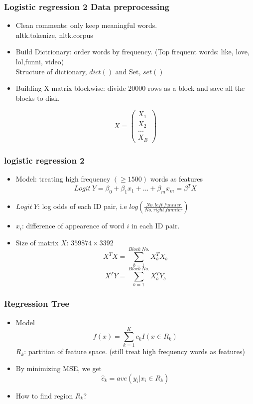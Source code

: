 \documentclass[fleqn]{beamer}
\begin{document}
\begin{frame}
\frametitle{Logistic regression 2 Data preprocessing}
    \begin{itemize}
     \item Clean comments: only keep meaningful words.\\
     nltk.tokenize, nltk.corpus 
     \item Build Dictrionary: order words by frequency. (Top frequent words: like, love, lol,funni, video) \\
     Structure of dictionary, $dict()$ and Set, $set()$
     \item Building X matrix blockwise: divide $20000$ rows as a block and save all the blocks to disk.      
	 \begin{center}
	 \[ X =\left( \begin{array}{ccc}
	    X_1 \\
	    X_2 \\
	    ... \\
	    X_B \end{array} \right)
	  \]
	\end{center}
     \end{itemize}

\end{frame}
\begin{frame}
\frametitle{logistic regression 2}
    \begin{itemize}
     \item Model: treating high frequency $(\geq 1500)$ words as features\\
     $$Logit\ Y = \beta_0 + \beta_1 x_1 + ... + \beta_m x_m = \beta^T X$$
     \item $Logit\ Y$: log odds of each ID pair, i.e $log(\frac{No.\ left\ funnier}{No.\ right\ funnier})$
     \item $x_i$:  difference of appearence of word $i$ in each ID pair.
     \item Size of matrix $X$: $359874 \times 3392$\\
     $$X^TX = \sum_{b=1}^{Block\ No.} X_b^TX_b$$
     $$X^TY = \sum_{b=1}^{Block\ No.} X_b^TY_b$$
    \end{itemize}
\end{frame}
\begin{frame}
\frametitle{Regression Tree}
    \begin{itemize}
     \item Model
     $$f(x) = \sum_{k=1}^K c_k I(x \in R_k)$$
     $R_k$: partition of feature space. (still treat high frequency words as features)
     \item By minimizing MSE, we get
     $$\hat{c}_k = ave(y_i | x_i \in R_k)$$
     \item How to find region $R_k$?
    \end{itemize}
\end{frame}
\end{document}
